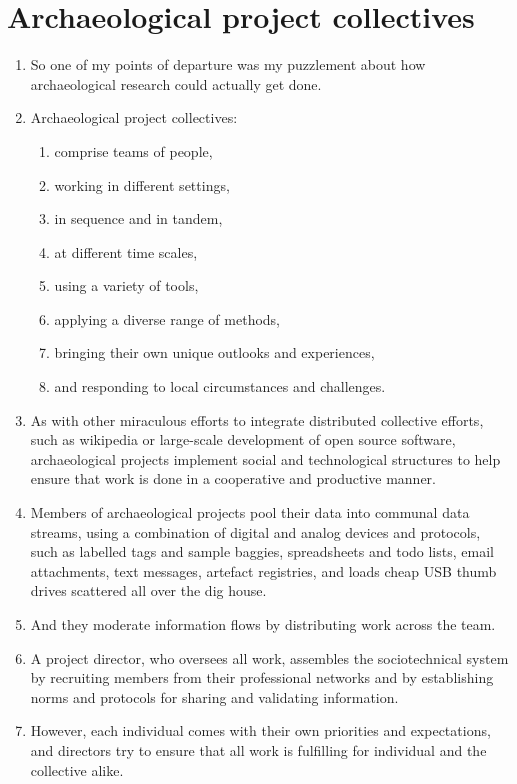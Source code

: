 \documentclass[12pt]{article}
\begin{document}
\section{Archaeological project collectives}
\begin{enumerate}
  \item So one of my points of departure was my puzzlement about how archaeological research could actually get done.
  \item Archaeological project collectives:
  \begin{enumerate}
    \item comprise teams of people,
    \item working in different settings,
    \item in sequence and in tandem,
    \item at different time scales,
    \item using a variety of tools,
    \item applying a diverse range of methods,
    \item bringing their own unique outlooks and experiences,
    \item and responding to local circumstances and challenges.
  \end{enumerate}
  \item As with other miraculous efforts to integrate distributed collective efforts, such as wikipedia or large-scale development of open source software, archaeological projects implement social and technological structures to help ensure that work is done in a cooperative and productive manner.
  \item Members of archaeological projects pool their data into communal data streams, using a combination of digital and analog devices and protocols, such as labelled tags and sample baggies, spreadsheets and todo lists, email attachments, text messages, artefact registries, and loads cheap USB thumb drives scattered all over the dig house.
  \item And they moderate information flows by distributing work across the team.
  \item A project director, who oversees all work, assembles the sociotechnical system by recruiting members from their professional networks and by establishing norms and protocols for sharing and validating information.
  \item However, each individual comes with their own priorities and expectations, and directors try to ensure that all work is fulfilling for individual and the collective alike.
\end{enumerate}
\end{document}

